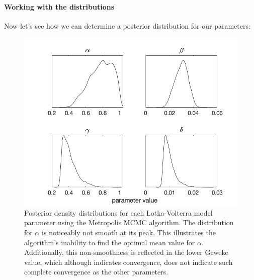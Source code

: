 \paragraph{Working with the distributions}
\par Now let's see how we can determine a posterior distribution for our parameters:
\begin{figure}[H]
    \centering
    \includegraphics[width=15cm]{MCMC_figs/met_lv_final/final_mh_den.png}
    \caption{Posterior density distributions for each Lotka-Volterra model parameter using the Metropolis MCMC algorithm. The distribution for $\alpha$ is noticeably not smooth at its peak. This illustrates the algorithm's inability to find the optimal mean value for $\alpha$. Additionally, this non-smoothness is reflected in the lower Geweke value, which although indicates convergence, does not indicate such complete convergence as the other parameters.}
    \label{fig:4mcmc}
\end{figure}
